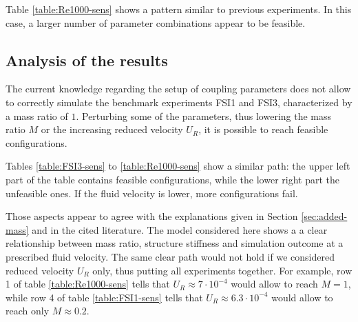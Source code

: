 Table \ref{table:Re1000-sens} shows a pattern similar to previous experiments. In this case, a larger number of parameter combinations appear to be feasible. 

\subsection{Analysis of the results}

The current knowledge regarding the setup of coupling parameters does not allow to correctly simulate the benchmark experiments FSI1 and FSI3, characterized by a mass ratio of $1$. Perturbing some of the parameters, thus lowering the mass ratio $M$ or the increasing reduced velocity $U_R$, it is possible to reach feasible configurations. 

Tables \ref{table:FSI3-sens} to \ref{table:Re1000-sens} show a similar path: the upper left part of the table contains feasible configurations, while the lower right part the unfeasible ones. If the fluid velocity is lower, more configurations fail.

Those aspects appear to agree with the explanations given in Section \ref{sec:added-mass} and in the cited literature. The model considered here shows a a clear relationship between mass ratio, structure stiffness and simulation outcome at a prescribed fluid velocity. The same clear path would not hold if we considered reduced velocity $U_R$ only, thus putting all experiments together. For example, row 1 of table \ref{table:Re1000-sens} tells that $U_R \approx 7\cdot 10^{-4}$ would allow to reach $M=1$, while row 4 of table \ref{table:FSI1-sens} tells that $U_R \approx 6.3\cdot 10^{-4}$ would allow to reach only $M\approx0.2$.

